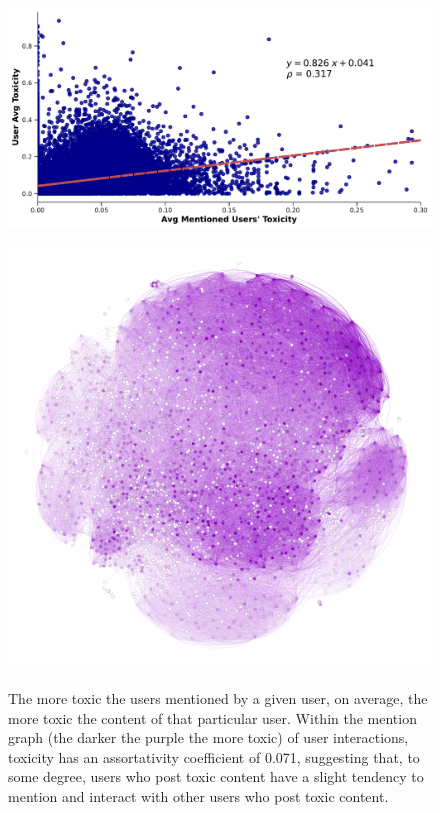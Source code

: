 \begin{figure}
\begin{minipage}[l]{0.6\textwidth}
\includegraphics[width=1\columnwidth]{figures/toxicity_vs_mentioned_toxicity-20240424.pdf} 
\end{minipage}
\begin{minipage}{.33\textwidth}
  \centering
  \includegraphics[width=1\linewidth]{figures/toxicity-graph.png}
  \label{fig:Twitter-reddit-toxicity-time}
\end{minipage}
\begin{minipage}[l]{1\textwidth}
\caption{The more toxic the users mentioned by a given user, on average, the more toxic the content of that particular user. Within the mention graph (the darker the purple the more toxic) of user interactions, toxicity has an assortativity coefficient of 0.071, suggesting that, to some degree, users who post toxic content have a slight tendency to mention and interact with other users who post toxic content. \label{fig:toxicity-vs-mention}}
\end{minipage}

\end{figure}

